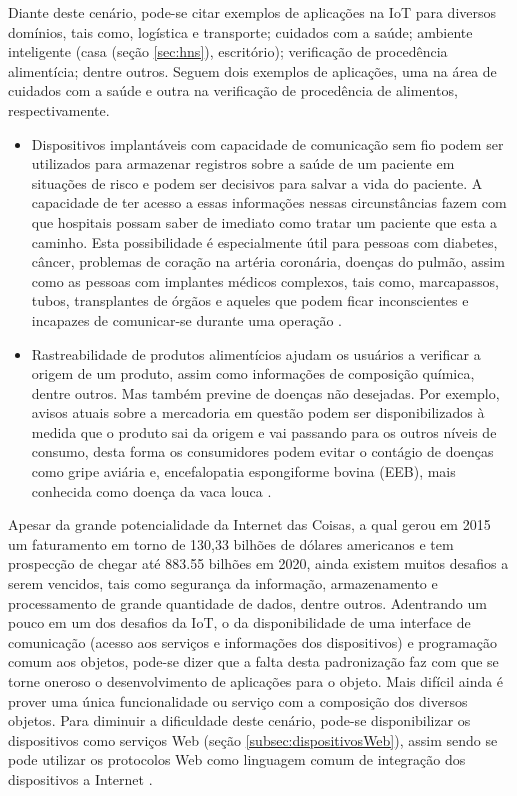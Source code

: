 Diante deste cenário, pode-se citar exemplos de aplicações na IoT para diversos domínios, tais como, logística e transporte; cuidados com a saúde; ambiente inteligente (casa (seção \ref{sec:hns}), escritório); \cite{Atzori:2010} verificação de procedência alimentícia; dentre outros. Seguem dois exemplos de aplicações, uma na área de cuidados com a saúde e outra na verificação de procedência de alimentos, respectivamente.

\begin{itemize}
\item Dispositivos implantáveis com capacidade de comunicação sem fio podem ser utilizados para armazenar registros sobre a saúde de um paciente em situações de risco e podem ser decisivos para salvar a vida do paciente. A capacidade de ter acesso a essas informações nessas circunstâncias fazem com que hospitais possam saber de imediato como tratar um paciente que esta a caminho. Esta possibilidade é especialmente útil para pessoas com diabetes, câncer, problemas de coração na artéria coronária, doenças do pulmão, assim como as pessoas com implantes médicos complexos, tais como, marcapassos, tubos, transplantes de órgãos e aqueles que podem ficar inconscientes e incapazes de comunicar-se durante uma operação \cite{Weber:2010}.
\item Rastreabilidade de produtos alimentícios ajudam os usuários a verificar a origem de um produto, assim como informações de composição química, dentre outros. Mas também previne de doenças não desejadas. Por exemplo, avisos atuais sobre a mercadoria em questão podem ser disponibilizados à medida que o produto sai da origem e vai passando para os outros níveis de consumo, desta forma os consumidores podem evitar o contágio de doenças como gripe aviária e, encefalopatia espongiforme bovina (EEB), mais conhecida como doença da vaca louca \cite{Weber:2010}.
\end{itemize}

Apesar da grande potencialidade da Internet das Coisas, a qual gerou em 2015 um faturamento em torno de 130,33 bilhões de dólares americanos e tem prospecção de chegar até 883.55 bilhões em 2020\footnotemark {}, ainda existem muitos desafios a serem vencidos, tais como segurança da informação, armazenamento e processamento de grande quantidade de dados, dentre outros. Adentrando um pouco em um dos desafios da IoT, o da disponibilidade de uma interface de comunicação (acesso aos serviços e informações dos dispositivos) e programação comum aos objetos, pode-se dizer que a falta desta padronização faz com que se torne oneroso o desenvolvimento de aplicações para o objeto. Mais difícil ainda é prover uma única funcionalidade ou serviço com a composição dos diversos objetos. Para diminuir a dificuldade deste cenário, pode-se disponibilizar os dispositivos como serviços Web (seção \ref{subsec:dispositivosWeb}), assim sendo se pode utilizar os protocolos Web como linguagem comum de integração dos dispositivos a Internet \cite{Franca:2011}.


